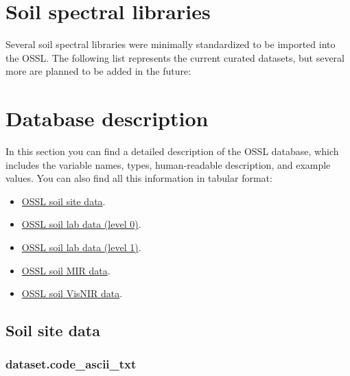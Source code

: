 \documentclass[
  letterpaper,
  DIV=11,
  numbers=noendperiod]{scrreprt}
\providecommand{\tightlist}{%
  \setlength{\itemsep}{0pt}\setlength{\parskip}{0pt}}\usepackage{longtable,booktabs,array}
\begin{document}

\chapter{Soil spectral libraries}\label{sec-libraries}

Several soil spectral libraries were minimally standardized to be
imported into the OSSL. The following list represents the current
curated datasets, but several more are planned to be added in the
future:


\chapter{Database description}\label{sec-db-desc}

In this section you can find a detailed description of the OSSL
database, which includes the variable names, types, human-readable
description, and example values. You can also find all this information
in tabular format:

\begin{itemize}
\tightlist
\item
  \href{https://github.com/soilspectroscopy/ossl-manual/tree/main/tabular/ossl_level0_names_soilsite.csv}{OSSL
  soil site data}.
\item
  \href{https://github.com/soilspectroscopy/ossl-manual/tree/main/tabular/ossl_level0_names_soillab.csv}{OSSL
  soil lab data (level 0)}.
\item
  \href{https://github.com/soilspectroscopy/ossl-manual/tree/main/tabular/ossl_level1_names_soillab.csv}{OSSL
  soil lab data (level 1)}.
\item
  \href{https://github.com/soilspectroscopy/ossl-manual/tree/main/tabular/ossl_level0_names_mir.csv}{OSSL
  soil MIR data}.
\item
  \href{https://github.com/soilspectroscopy/ossl-manual/tree/main/tabular/ossl_level0_names_visnir.csv}{OSSL
  soil VisNIR data}.
\end{itemize}

\section{Soil site data}\label{sites-table}

\subsection{dataset.code\_ascii\_txt}\label{dataset.code_ascii_txt}
\end{document}
